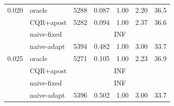\begin{table}[t]
\begin{tabular}{llrrrrr}
\midrule
0.020 & oracle      & 5288 & 0.087 & 1.00 & 2.20 & 36.5 \\
      & CQR+apost   & 5282 & 0.094 & 1.00 & 2.37 & 36.6 \\
      & naive-fixed & \multicolumn{5}{c}{INF} \\
      & naive-adapt & 5394 & 0.482 & 1.00 & 3.00 & 33.7 \\
\midrule
0.025 & oracle      & 5271 & 0.105 & 1.00 & 2.23 & 36.9 \\
      & CQR+apost   & \multicolumn{5}{c}{INF} \\
      & naive-fixed & \multicolumn{5}{c}{INF} \\
      & naive-adapt & 5396 & 0.502 & 1.00 & 3.00 & 33.7 \\
\bottomrule
\end{tabular}
\end{table}

